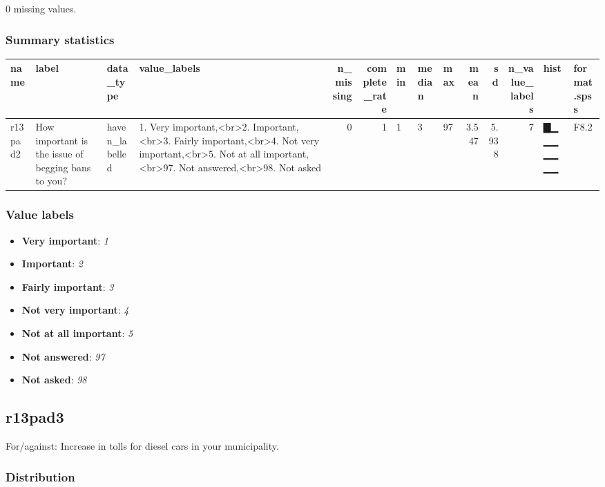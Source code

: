 \documentclass[
]{book}
\providecommand{\tightlist}{%
  \setlength{\itemsep}{0pt}\setlength{\parskip}{0pt}}
\begin{document}
0 missing values.

\hypertarget{r13pad2_summary}{%
\subsubsection{Summary statistics}\label{r13pad2_summary}}

\begin{tabular}{l|l|l|l|r|r|l|l|l|r|r|r|l|l}
\hline
name & label & data_type & value_labels & n_missing & complete_rate & min & median & max & mean & sd & n_value_labels & hist & format.spss\\
\hline
r13pad2 & How important is the issue of begging bans to you? & haven_labelled & 1. Very important,<br>2. Important,<br>3. Fairly important,<br>4. Not very important,<br>5. Not at all important,<br>97. Not answered,<br>98. Not asked & 0 & 1 & 1 & 3 & 97 & 3.547 & 5.938 & 7 & ▇▁▁▁▁▁▁▁ & F8.2\\
\hline
\end{tabular}

\hypertarget{r13pad2_labels}{%
\subsubsection{Value labels}\label{r13pad2_labels}}

\begin{itemize}
\tightlist
\item
  \textbf{Very important}: \emph{1}
\item
  \textbf{Important}: \emph{2}
\item
  \textbf{Fairly important}: \emph{3}
\item
  \textbf{Not very important}: \emph{4}
\item
  \textbf{Not at all important}: \emph{5}
\item
  \textbf{Not answered}: \emph{97}
\item
  \textbf{Not asked}: \emph{98}
\end{itemize}

\hypertarget{r13pad3}{%
\subsection{r13pad3}\label{r13pad3}}

For/against: Increase in tolls for diesel cars in your municipality.

\hypertarget{r13pad3_distribution}{%
\subsubsection{Distribution}\label{r13pad3_distribution}}
\end{document}
